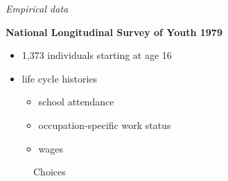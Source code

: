 \begin{frame}\begin{center}
		\LARGE\textit{Empirical data}
\end{center}\end{frame}
\begin{frame}\textbf{National Longitudinal Survey of Youth 1979}\vspace{0.3cm}

\begin{itemize}\setlength\itemsep{1em}
\item 1,373 individuals starting at age 16
\item life cycle histories \medskip
\begin{itemize}\setlength\itemsep{1em}
\item school attendance
\item occupation-specific work status
\item wages
\end{itemize}
\end{itemize}
\end{frame}
\begin{frame}
  \begin{figure}
  \caption{Choices}
  \end{figure}
\end{frame}

